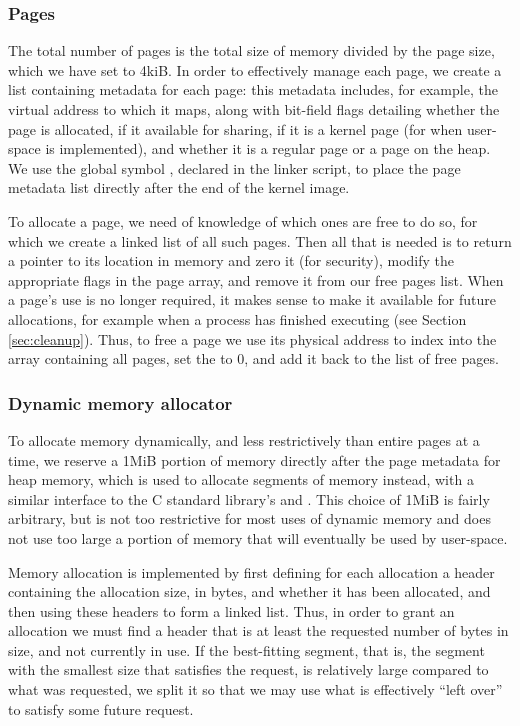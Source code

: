     \subsubsection{Pages}
        \label{sec:pages}
        The total number of pages is the total size of memory divided by the
        page size, which we have set to 4kiB. In order to effectively manage
        each page, we create a list containing metadata for each page: this
        metadata includes, for example, the virtual address to which it maps,
        along with bit-field flags detailing whether the page is allocated, if
        it available for sharing, if it is a kernel page (for when user-space is
        implemented), and whether it is a regular page or a page on the heap.
        We use the global symbol , declared in the linker script,
        to place the page metadata list directly after the end of the kernel
        image.

        To allocate a page, we need of knowledge of which ones are free to do
        so, for which we create a linked list of all such pages. Then all that
        is needed is to return a pointer to its location in memory and zero it
        (for security), modify the appropriate flags in the page array, and
        remove it from our free pages list. When a page's use is no longer
        required, it makes sense to make it available for future allocations,
        for example when a process has finished executing (see Section
        \ref{sec:cleanup}). Thus, to free a page we use its physical address to
        index into the array containing all pages, set the  to
        0, and add it back to the list of free pages.

    \subsubsection{Dynamic memory allocator}
        To allocate memory dynamically, and less restrictively than entire pages
        at a time, we reserve a 1MiB portion of memory directly after the page
        metadata for heap memory, which is used to allocate segments of memory
        instead, with a similar interface to the C standard library's
         and . This choice of 1MiB is fairly arbitrary,
        but is not too restrictive for most uses of dynamic memory and does not
        use too large a portion of memory that will eventually be used by
        user-space.
        
        Memory allocation is implemented by first defining for each allocation a
        header containing the allocation size, in bytes, and whether it has been
        allocated, and then using these headers to form a linked list. Thus, in
        order to grant an allocation we must find a header that is at least the
        requested number of bytes in size, and not currently in use. If the
        best-fitting segment, that is, the segment with the smallest size that
        satisfies the request, is relatively large compared to what was
        requested, we split it so that we may use what is effectively ``left
        over'' to satisfy some future request.

